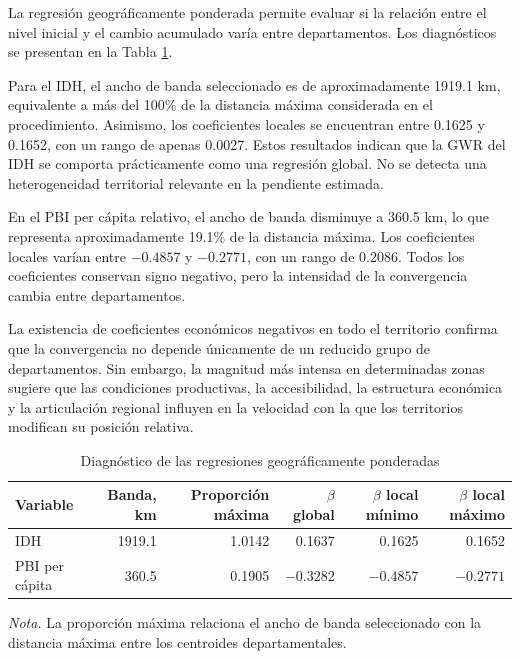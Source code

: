 La regresión geográficamente ponderada permite evaluar si la relación entre el
nivel inicial y el cambio acumulado varía entre departamentos. Los diagnósticos
se presentan en la Tabla \ref{tab:diagnostico_gwr}.

Para el IDH, el ancho de banda seleccionado es de aproximadamente 1919.1 km,
equivalente a más del 100\% de la distancia máxima considerada en el
procedimiento. Asimismo, los coeficientes locales se encuentran entre 0.1625 y
0.1652, con un rango de apenas 0.0027. Estos resultados indican que la GWR del
IDH se comporta prácticamente como una regresión global. No se detecta una
heterogeneidad territorial relevante en la pendiente estimada.

En el PBI per cápita relativo, el ancho de banda disminuye a 360.5 km, lo que
representa aproximadamente 19.1\% de la distancia máxima. Los coeficientes
locales varían entre $-0.4857$ y $-0.2771$, con un rango de 0.2086. Todos los
coeficientes conservan signo negativo, pero la intensidad de la convergencia
cambia entre departamentos.

La existencia de coeficientes económicos negativos en todo el territorio
confirma que la convergencia no depende únicamente de un reducido grupo de
departamentos. Sin embargo, la magnitud más intensa en determinadas zonas
sugiere que las condiciones productivas, la accesibilidad, la estructura
económica y la articulación regional influyen en la velocidad con la que los
territorios modifican su posición relativa.

\begin{table}[H]
\centering
\caption{Diagnóstico de las regresiones geográficamente ponderadas}
\label{tab:diagnostico_gwr}
\small
\begin{tabular}{lrrrrr}
\toprule
\textbf{Variable} &
\textbf{Banda, km} &
\textbf{Proporción máxima} &
\textbf{$\beta$ global} &
\textbf{$\beta$ local mínimo} &
\textbf{$\beta$ local máximo} \\
\midrule
IDH
& 1919.1 & 1.0142 & 0.1637 & 0.1625 & 0.1652 \\

PBI per cápita
& 360.5 & 0.1905 & $-0.3282$ & $-0.4857$ & $-0.2771$ \\
\bottomrule
\end{tabular}
\begin{flushleft}
\footnotesize
\textit{Nota.} La proporción máxima relaciona el ancho de banda seleccionado
con la distancia máxima entre los centroides departamentales.
\end{flushleft}
\end{table}

